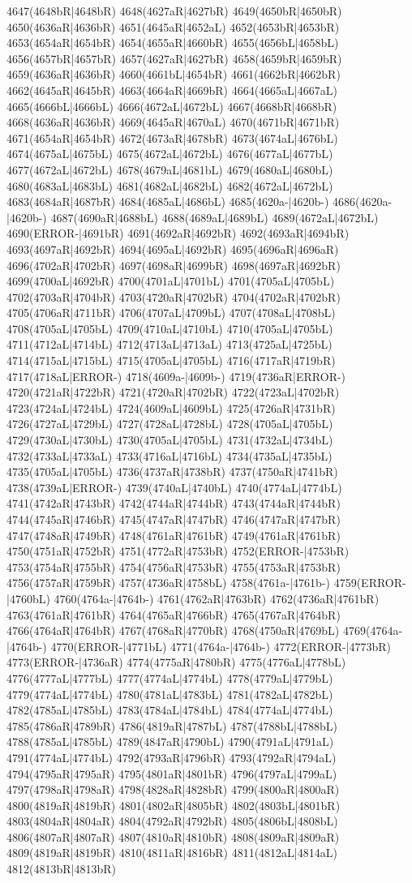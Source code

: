 4647(4648bR|4648bR) 4648(4627aR|4627bR) 4649(4650bR|4650bR) 4650(4636aR|4636bR) 4651(4645aR|4652aL) 4652(4653bR|4653bR) 4653(4654aR|4654bR) 4654(4655aR|4660bR) 4655(4656bL|4658bL) 4656(4657bR|4657bR) 4657(4627aR|4627bR) 4658(4659bR|4659bR) 4659(4636aR|4636bR) 4660(4661bL|4654bR) 4661(4662bR|4662bR) 4662(4645aR|4645bR) 4663(4664aR|4669bR) 4664(4665aL|4667aL) 4665(4666bL|4666bL) 4666(4672aL|4672bL) 4667(4668bR|4668bR) 4668(4636aR|4636bR) 4669(4645aR|4670aL) 4670(4671bR|4671bR) 4671(4654aR|4654bR) 4672(4673aR|4678bR) 4673(4674aL|4676bL) 4674(4675aL|4675bL) 4675(4672aL|4672bL) 4676(4677aL|4677bL) 4677(4672aL|4672bL) 4678(4679aL|4681bL) 4679(4680aL|4680bL) 4680(4683aL|4683bL) 4681(4682aL|4682bL) 4682(4672aL|4672bL) 4683(4684aR|4687bR) 4684(4685aL|4686bL) 4685(4620a-|4620b-) 4686(4620a-|4620b-) 4687(4690aR|4688bL) 4688(4689aL|4689bL) 4689(4672aL|4672bL) 4690(ERROR-|4691bR) 4691(4692aR|4692bR) 4692(4693aR|4694bR) 4693(4697aR|4692bR) 4694(4695aL|4692bR) 4695(4696aR|4696aR) 4696(4702aR|4702bR) 4697(4698aR|4699bR) 4698(4697aR|4692bR) 4699(4700aL|4692bR) 4700(4701aL|4701bL) 4701(4705aL|4705bL) 4702(4703aR|4704bR) 4703(4720aR|4702bR) 4704(4702aR|4702bR) 4705(4706aR|4711bR) 4706(4707aL|4709bL) 4707(4708aL|4708bL) 4708(4705aL|4705bL) 4709(4710aL|4710bL) 4710(4705aL|4705bL) 4711(4712aL|4714bL) 4712(4713aL|4713aL) 4713(4725aL|4725bL) 4714(4715aL|4715bL) 4715(4705aL|4705bL) 4716(4717aR|4719bR) 4717(4718aL|ERROR-) 4718(4609a-|4609b-) 4719(4736aR|ERROR-) 4720(4721aR|4722bR) 4721(4720aR|4702bR) 4722(4723aL|4702bR) 4723(4724aL|4724bL) 4724(4609aL|4609bL) 4725(4726aR|4731bR) 4726(4727aL|4729bL) 4727(4728aL|4728bL) 4728(4705aL|4705bL) 4729(4730aL|4730bL) 4730(4705aL|4705bL) 4731(4732aL|4734bL) 4732(4733aL|4733aL) 4733(4716aL|4716bL) 4734(4735aL|4735bL) 4735(4705aL|4705bL) 4736(4737aR|4738bR) 4737(4750aR|4741bR) 4738(4739aL|ERROR-) 4739(4740aL|4740bL) 4740(4774aL|4774bL) 4741(4742aR|4743bR) 4742(4744aR|4744bR) 4743(4744aR|4744bR) 4744(4745aR|4746bR) 4745(4747aR|4747bR) 4746(4747aR|4747bR) 4747(4748aR|4749bR) 4748(4761aR|4761bR) 4749(4761aR|4761bR) 4750(4751aR|4752bR) 4751(4772aR|4753bR) 4752(ERROR-|4753bR) 4753(4754aR|4755bR) 4754(4756aR|4753bR) 4755(4753aR|4753bR) 4756(4757aR|4759bR) 4757(4736aR|4758bL) 4758(4761a-|4761b-) 4759(ERROR-|4760bL) 4760(4764a-|4764b-) 4761(4762aR|4763bR) 4762(4736aR|4761bR) 4763(4761aR|4761bR) 4764(4765aR|4766bR) 4765(4767aR|4764bR) 4766(4764aR|4764bR) 4767(4768aR|4770bR) 4768(4750aR|4769bL) 4769(4764a-|4764b-) 4770(ERROR-|4771bL) 4771(4764a-|4764b-) 4772(ERROR-|4773bR) 4773(ERROR-|4736aR) 4774(4775aR|4780bR) 4775(4776aL|4778bL) 4776(4777aL|4777bL) 4777(4774aL|4774bL) 4778(4779aL|4779bL) 4779(4774aL|4774bL) 4780(4781aL|4783bL) 4781(4782aL|4782bL) 4782(4785aL|4785bL) 4783(4784aL|4784bL) 4784(4774aL|4774bL) 4785(4786aR|4789bR) 4786(4819aR|4787bL) 4787(4788bL|4788bL) 4788(4785aL|4785bL) 4789(4847aR|4790bL) 4790(4791aL|4791aL) 4791(4774aL|4774bL) 4792(4793aR|4796bR) 4793(4792aR|4794aL) 4794(4795aR|4795aR) 4795(4801aR|4801bR) 4796(4797aL|4799aL) 4797(4798aR|4798aR) 4798(4828aR|4828bR) 4799(4800aR|4800aR) 4800(4819aR|4819bR) 4801(4802aR|4805bR) 4802(4803bL|4801bR) 4803(4804aR|4804aR) 4804(4792aR|4792bR) 4805(4806bL|4808bL) 4806(4807aR|4807aR) 4807(4810aR|4810bR) 4808(4809aR|4809aR) 4809(4819aR|4819bR) 4810(4811aR|4816bR) 4811(4812aL|4814aL) 4812(4813bR|4813bR) 